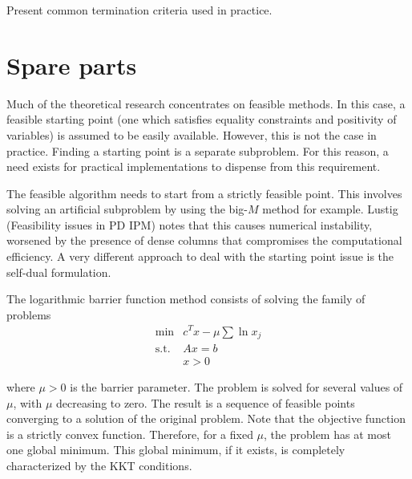 Present common termination criteria used in practice.


%
%
\section{Spare parts}

Much of the theoretical research concentrates on feasible 
methods. In this case, a feasible starting point (one which 
satisfies equality constraints and positivity of variables) 
is assumed to be easily available. However, this is not the 
case in practice. Finding a starting point is a separate 
subproblem. For this reason, a need exists for practical 
implementations to dispense from this requirement.

The feasible algorithm needs to start from a strictly feasible 
point. This involves solving an artificial subproblem by using 
the big-$M$ method for example. Lustig (Feasibility issues in 
PD IPM) notes that this causes numerical instability, worsened 
by the presence of dense columns that compromises the 
computational efficiency. A very different approach to deal 
with the starting point issue is the self-dual formulation.

\hrulefill

The logarithmic barrier function method consists of solving the 
family of problems
\begin{eqnarray*}
   \min & c^Tx - \mu \sum \ln x_j \\
   \mbox{s.t.} & Ax = b \\
               & x>0
\end{eqnarray*}

where $\mu>0$ is the barrier parameter. The problem is solved 
for several values of $\mu$, with $\mu$ decreasing to zero. 
The result is a sequence of feasible points converging to a 
solution of the original problem. Note that the objective 
function is a strictly convex function. Therefore, for a 
fixed $\mu$, the problem has at most one global minimum. 
This global minimum, if it exists, is completely characterized 
by the KKT conditions.

